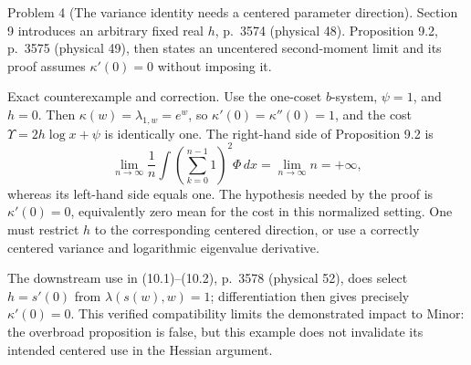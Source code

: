\documentclass[10pt]{article}
\begin{document}
Problem 4 (The variance identity needs a centered parameter direction).  Section 9 introduces an arbitrary fixed real \(h\), p. 3574 (physical 48). Proposition 9.2, p. 3575 (physical 49), then states an uncentered second-moment limit and its proof assumes \(\kappa'(0)=0\) without imposing it.\par
Exact counterexample and correction. Use the one-coset \(b\)-system, \(\psi=1\), and \(h=0\). Then \(\kappa(w)=\lambda_{1,w}=e^w\), so \(\kappa'(0)=\kappa''(0)=1\), and the cost \(\Upsilon=2h\log x+\psi\) is identically one. The right-hand side of Proposition 9.2 is \[\lim_{n\to\infty}\frac1n
   \int\left(\sum_{k=0}^{n-1}1\right)^2\Phi\,dx
 =\lim_{n\to\infty}n=+\infty,\] whereas its left-hand side equals one. The hypothesis needed by the proof is \(\kappa'(0)=0\), equivalently zero mean for the cost in this normalized setting. One must restrict \(h\) to the corresponding centered direction, or use a correctly centered variance and logarithmic eigenvalue derivative.\par
The downstream use in (10.1)–(10.2), p. 3578 (physical 52), does select \(h=s'(0)\) from \(\lambda(s(w),w)=1\); differentiation then gives precisely \(\kappa'(0)=0\). This verified compatibility limits the demonstrated impact to Minor: the overbroad proposition is false, but this example does not invalidate its intended centered use in the Hessian argument.\par
\end{document}
